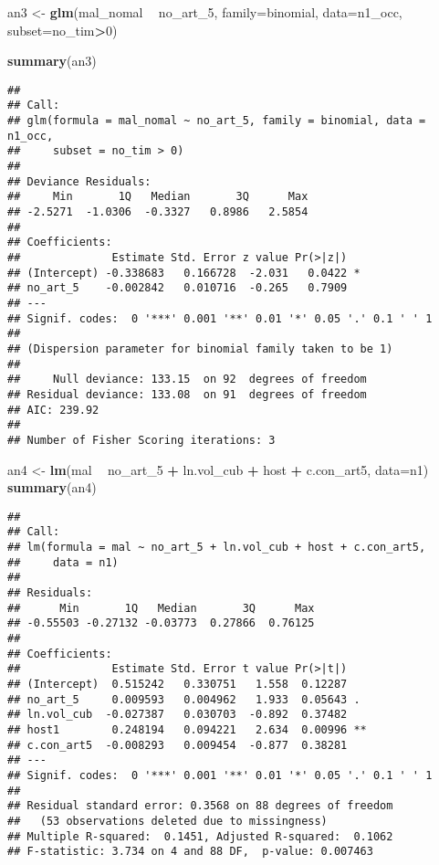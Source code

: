 \documentclass[]{article}
\newenvironment{Shaded}{\begin{snugshade}}{\end{snugshade}}
\newcommand{\KeywordTok}[1]{\textcolor[rgb]{0.13,0.29,0.53}{\textbf{#1}}}
\newcommand{\DataTypeTok}[1]{\textcolor[rgb]{0.13,0.29,0.53}{#1}}
\newcommand{\DecValTok}[1]{\textcolor[rgb]{0.00,0.00,0.81}{#1}}
\newcommand{\StringTok}[1]{\textcolor[rgb]{0.31,0.60,0.02}{#1}}
\newcommand{\OperatorTok}[1]{\textcolor[rgb]{0.81,0.36,0.00}{\textbf{#1}}}
\newcommand{\NormalTok}[1]{#1}
\begin{document}
\begin{Shaded}
\begin{Highlighting}[]
\NormalTok{an3 <-}\StringTok{ }\KeywordTok{glm}\NormalTok{(mal_nomal }\OperatorTok{~}\StringTok{ }\NormalTok{no_art_}\DecValTok{5}\NormalTok{, }\DataTypeTok{family=}\NormalTok{binomial, }\DataTypeTok{data=}\NormalTok{n1_occ, }\DataTypeTok{subset=}\NormalTok{no_tim}\OperatorTok{>}\DecValTok{0}\NormalTok{)}

\KeywordTok{summary}\NormalTok{(an3)}
\end{Highlighting}
\end{Shaded}

\begin{verbatim}
## 
## Call:
## glm(formula = mal_nomal ~ no_art_5, family = binomial, data = n1_occ, 
##     subset = no_tim > 0)
## 
## Deviance Residuals: 
##     Min       1Q   Median       3Q      Max  
## -2.5271  -1.0306  -0.3327   0.8986   2.5854  
## 
## Coefficients:
##              Estimate Std. Error z value Pr(>|z|)  
## (Intercept) -0.338683   0.166728  -2.031   0.0422 *
## no_art_5    -0.002842   0.010716  -0.265   0.7909  
## ---
## Signif. codes:  0 '***' 0.001 '**' 0.01 '*' 0.05 '.' 0.1 ' ' 1
## 
## (Dispersion parameter for binomial family taken to be 1)
## 
##     Null deviance: 133.15  on 92  degrees of freedom
## Residual deviance: 133.08  on 91  degrees of freedom
## AIC: 239.92
## 
## Number of Fisher Scoring iterations: 3
\end{verbatim}

\begin{Shaded}
\begin{Highlighting}[]
\NormalTok{an4 <-}\StringTok{ }\KeywordTok{lm}\NormalTok{(mal }\OperatorTok{~}\StringTok{ }\NormalTok{no_art_}\DecValTok{5} \OperatorTok{+}\StringTok{ }\NormalTok{ln.vol_cub }\OperatorTok{+}\StringTok{ }\NormalTok{host }\OperatorTok{+}\StringTok{ }\NormalTok{c.con_art5, }\DataTypeTok{data=}\NormalTok{n1)}
\KeywordTok{summary}\NormalTok{(an4)}
\end{Highlighting}
\end{Shaded}

\begin{verbatim}
## 
## Call:
## lm(formula = mal ~ no_art_5 + ln.vol_cub + host + c.con_art5, 
##     data = n1)
## 
## Residuals:
##      Min       1Q   Median       3Q      Max 
## -0.55503 -0.27132 -0.03773  0.27866  0.76125 
## 
## Coefficients:
##              Estimate Std. Error t value Pr(>|t|)   
## (Intercept)  0.515242   0.330751   1.558  0.12287   
## no_art_5     0.009593   0.004962   1.933  0.05643 . 
## ln.vol_cub  -0.027387   0.030703  -0.892  0.37482   
## host1        0.248194   0.094221   2.634  0.00996 **
## c.con_art5  -0.008293   0.009454  -0.877  0.38281   
## ---
## Signif. codes:  0 '***' 0.001 '**' 0.01 '*' 0.05 '.' 0.1 ' ' 1
## 
## Residual standard error: 0.3568 on 88 degrees of freedom
##   (53 observations deleted due to missingness)
## Multiple R-squared:  0.1451, Adjusted R-squared:  0.1062 
## F-statistic: 3.734 on 4 and 88 DF,  p-value: 0.007463
\end{verbatim}
\end{document}
